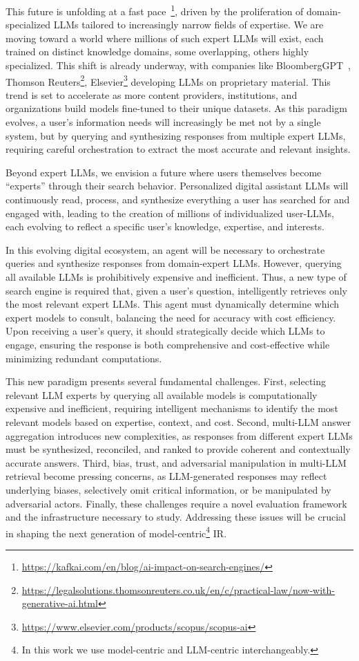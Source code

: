 This future is unfolding at a fast pace~\cite{caramancion2024large}\footnote{\url{https://kafkai.com/en/blog/ai-impact-on-search-engines/}}, driven by the proliferation of domain-specialized LLMs tailored to increasingly narrow fields of expertise. We are moving toward a world where millions of such expert LLMs will exist, each trained on distinct knowledge domains, some overlapping, others highly specialized. This shift is already underway, with companies like BloombergGPT~\cite{wu2023bloomberggpt}, Thomson Reuters\footnote{\url{https://legalsolutions.thomsonreuters.co.uk/en/c/practical-law/now-with-generative-ai.html}}, Elsevier\footnote{\url{https://www.elsevier.com/products/scopus/scopus-ai}} developing LLMs on proprietary material. This trend is set to accelerate as more content providers, institutions, and organizations build models fine-tuned to their unique datasets.
As this paradigm evolves, a user's information needs will increasingly be met not by a single system, but by querying and synthesizing responses from multiple expert LLMs, requiring careful orchestration to extract the most accurate and relevant insights.

Beyond expert LLMs, we envision a future where users themselves become ``experts'' through their search behavior. Personalized digital assistant LLMs will continuously read, process, and synthesize everything a user has searched for and engaged with, leading to the creation of millions of individualized user-LLMs, each evolving to reflect a specific user's knowledge, expertise, and interests.

In this evolving digital ecosystem, an agent will be necessary to orchestrate queries and synthesize responses from domain-expert LLMs. However, querying all available LLMs is prohibitively expensive and inefficient. Thus, a new type of search engine is required that, given a user's question, intelligently retrieves only the most relevant expert LLMs. This agent must dynamically determine which expert models to consult, balancing the need for accuracy with cost efficiency. Upon receiving a user's query, it should strategically decide which LLMs to engage, ensuring the response is both comprehensive and cost-effective while minimizing redundant computations. 

This new paradigm presents several fundamental challenges. First, selecting relevant LLM experts by querying all available models is computationally expensive and inefficient, requiring intelligent mechanisms to identify the most relevant models based on expertise, context, and cost. Second, multi-LLM answer aggregation introduces new complexities, as responses from different expert LLMs must be synthesized, reconciled, and ranked to provide coherent and contextually accurate answers. Third, bias, trust, and adversarial manipulation in multi-LLM retrieval become pressing concerns, as LLM-generated responses may reflect underlying biases, selectively omit critical information, or be manipulated by adversarial actors. Finally, these challenges require a novel evaluation framework and the infrastructure necessary to study. Addressing these issues will be crucial in shaping the next generation of model-centric\footnote{In this work we use model-centric and LLM-centric interchangeably.} IR.

